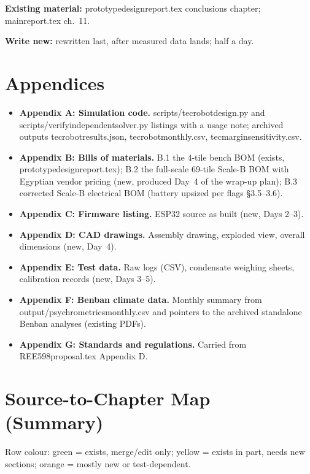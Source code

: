 \documentclass[11pt,a4paper]{article}
\newcommand{\f}[1]{{\ttfamily\def\_{\textunderscore\allowbreak}#1}}
\begin{document}
\textbf{Existing material:} \f{prototype\_design\_report.tex} conclusions
chapter; \f{main\_report.tex} ch.~11.

\textbf{Write new:} rewritten last, after measured data lands; half a day.

\section{Appendices}
\begin{itemize}[nosep,leftmargin=*]
  \item \textbf{Appendix A: Simulation code.} \f{scripts/tec\_robot\_design.py}
        and \f{scripts/verify\_independent\_solver.py} listings with a usage
        note; archived outputs \f{tec\_robot\_results.json},
        \f{tec\_robot\_monthly.csv}, \f{tec\_margin\_sensitivity.csv}.
  \item \textbf{Appendix B: Bills of materials.} B.1 the 4-tile bench BOM
        (exists, \f{prototype\_design\_report.tex}); B.2 the full-scale 69-tile
        Scale-B BOM with Egyptian vendor pricing (new, produced Day~4 of the
        wrap-up plan); B.3 corrected Scale-B electrical BOM
        (battery upsized per flags \S3.5--3.6).
  \item \textbf{Appendix C: Firmware listing.} ESP32 source as built
        (new, Days 2--3).
  \item \textbf{Appendix D: CAD drawings.} Assembly drawing, exploded view,
        overall dimensions (new, Day~4).
  \item \textbf{Appendix E: Test data.} Raw logs (CSV), condensate weighing
        sheets, calibration records (new, Days 3--5).
  \item \textbf{Appendix F: Benban climate data.} Monthly summary from
        \f{output/psychrometrics\_monthly.csv} and pointers to the archived
        standalone Benban analyses (existing PDFs).
  \item \textbf{Appendix G: Standards and regulations.} Carried from
        \f{REE598\_proposal.tex} Appendix D.
\end{itemize}

\section{Source-to-Chapter Map (Summary)}
Row colour: green = exists, merge/edit only; yellow = exists in part, needs new
sections; orange = mostly new or test-dependent.
\end{document}
